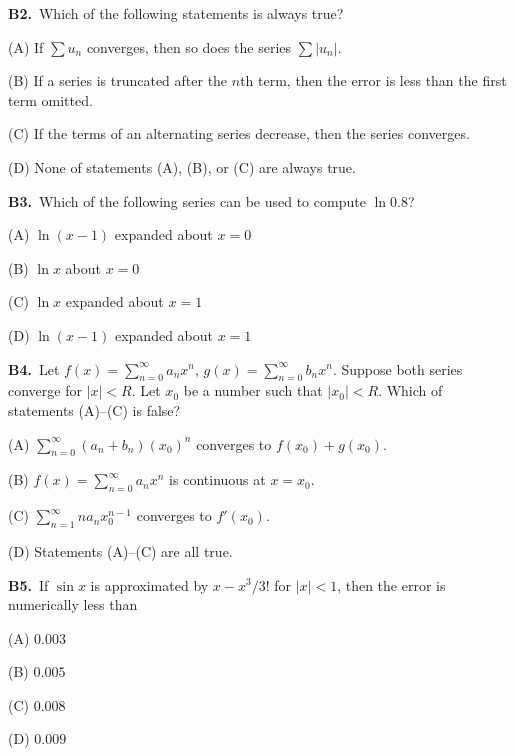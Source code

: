\documentclass[11pt]{article}
\begin{document}
\bigskip\noindent\textbf{B2.}\ Which of the following statements is always true?
\begin{list}{}{\setlength{\leftmargin}{3em}\setlength{\labelwidth}{2.5em}\setlength{\itemsep}{0pt}\setlength{\topsep}{2pt}}
\item[(A)] If $\displaystyle\sum u_n$ converges, then so does the series $\displaystyle\sum |u_n|$.
\item[(B)] If a series is truncated after the $n$th term, then the error is less than the first term omitted.
\item[(C)] If the terms of an alternating series decrease, then the series converges.
\item[(D)] None of statements (A), (B), or (C) are always true.
\end{list}

\bigskip\noindent\textbf{B3.}\ Which of the following series can be used to compute $\ln 0.8$?
\begin{list}{}{\setlength{\leftmargin}{3em}\setlength{\labelwidth}{2.5em}\setlength{\itemsep}{0pt}\setlength{\topsep}{2pt}}
\item[(A)] $\ln(x-1)$ expanded about $x=0$
\item[(B)] $\ln x$ about $x=0$
\item[(C)] $\ln x$ expanded about $x=1$
\item[(D)] $\ln(x-1)$ expanded about $x=1$
\end{list}

\bigskip\noindent\textbf{B4.}\ Let $f(x)=\displaystyle\sum_{n=0}^\infty a_nx^n$, $g(x)=\displaystyle\sum_{n=0}^\infty b_nx^n$. Suppose both series converge for $|x|<R$. Let $x_0$ be a number such that $|x_0|<R$. Which of statements (A)--(C) is false?
\begin{list}{}{\setlength{\leftmargin}{3em}\setlength{\labelwidth}{2.5em}\setlength{\itemsep}{0pt}\setlength{\topsep}{2pt}}
\item[(A)] $\displaystyle\sum_{n=0}^\infty (a_n+b_n)(x_0)^n$ converges to $f(x_0)+g(x_0)$.
\item[(B)] $f(x)=\displaystyle\sum_{n=0}^\infty a_nx^n$ is continuous at $x=x_0$.
\item[(C)] $\displaystyle\sum_{n=1}^\infty na_nx_0^{n-1}$ converges to $f'(x_0)$.
\item[(D)] Statements (A)--(C) are all true.
\end{list}

\bigskip\noindent\textbf{B5.}\ If $\sin x$ is approximated by $x-x^3/3!$ for $|x|<1$, then the error is numerically less than
\begin{list}{}{\setlength{\leftmargin}{3em}\setlength{\labelwidth}{2.5em}\setlength{\itemsep}{0pt}\setlength{\topsep}{2pt}}
\item[(A)] $0.003$
\item[(B)] $0.005$
\item[(C)] $0.008$
\item[(D)] $0.009$
\end{list}
\end{document}
